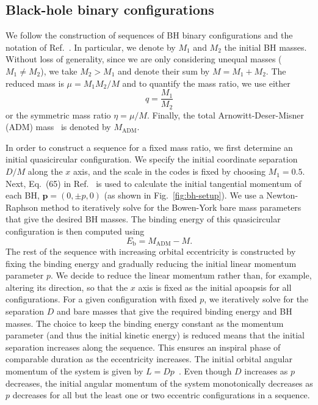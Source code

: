 \documentclass[floats,floatfix,showpacs,amssymb,physrev,twocolumn,superscriptaddress,reprint,
nofootinbib, longbibliography]{revtex4-2}
\begin{document}
\subsection{Black-hole binary configurations}
%
\label{sec:configs}
%
We follow the construction of sequences of BH binary configurations
and the notation of Ref.~\cite{Sperhake:2007gu}. In particular, we 
denote by $M_1$ 
and $M_2$ the initial BH masses. Without loss of generality, since 
we are only considering unequal masses ($M_1 \neq M_2$), we take $M_2 > M_1$
and denote their sum by $M = M_1 + M_2$. The reduced mass is 
$\mu = M_1 M_2 /M$ and to quantify the mass ratio, we use either
\begin{equation}
    q = \frac{M_1}{M_2}
    \label{eq:mass-ratio}
\end{equation}
or the symmetric mass ratio $\eta = \mu/M$. Finally, the 
total Arnowitt-Deser-Misner (ADM) mass~\cite{Arnowitt:1962hi} is denoted by 
$M_{\mathrm{ADM}}$.


In order to construct a sequence for a fixed mass ratio, we first 
determine an initial quasicircular configuration. We specify the initial
coordinate separation $D/M$ along the $x$ axis, and the scale in the codes 
is fixed by choosing $M_1=0.5$. Next, Eq.~(65) in 
Ref.~\cite{Brugmann:2008zz} is used to calculate the initial tangential 
momentum of each BH, $\mathbf{p}=(0,\pm p,0)$ (as shown in 
Fig.~\ref{fig:bh-setup}). We use a 
Newton-Raphson method to iteratively solve for the Bowen-York bare mass 
parameters that give the desired BH masses. The binding energy 
of this quasicircular configuration is then computed using
\begin{equation}
    E_{\mathrm{b}}=M_{\mathrm{ADM}}-M.\label{eq:binding-energy}
\end{equation}
The rest of the sequence with increasing orbital eccentricity is 
constructed by fixing the binding energy and gradually reducing the initial
linear momentum parameter $p$.
We decide to reduce the linear momentum rather than, for example, 
altering its direction,
so that the $x$ axis is fixed as the initial apoapsis for all configurations.
For a given configuration with fixed $p$, we 
iteratively solve for the separation $D$ and bare masses that give the 
required binding energy and BH masses. The choice to keep the 
binding energy constant as the momentum parameter (and thus the initial 
kinetic energy) is reduced means that the initial separation increases along 
the sequence. This ensures an inspiral phase of comparable duration as the 
eccentricity increases.
The initial orbital angular momentum of the system 
is given by $L=Dp$~\cite{York:1989jn}. Even though $D$ increases as $p$ 
decreases, the initial angular momentum of the system monotonically decreases 
as $p$ decreases for all but the least one or two eccentric configurations 
in a sequence.
\end{document}
